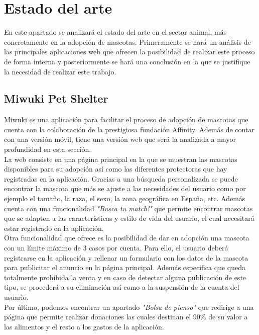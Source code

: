 \chapter{Estado del arte}\label{ch:estado-del-arte}

En este apartado se analizará el estado del arte en el sector animal, más concretamente en la adopción de mascotas.
Primeramente se hará un análisis de las principales aplicaciones web que ofrecen la posibilidad de realizar
este proceso de forma interna y posteriormente se hará una conclusión en la que se justifique la necesidad de realizar
este trabajo.

\section{Miwuki Pet Shelter}\label{sec:miwuki}

\href{https://petshelter.miwuki.com/}{Miwuki} es una aplicación para facilitar el proceso de adopción de mascotas que
cuenta con la colaboración de la prestigiosa fundación Affinity. Además de contar con una versión móvil, tiene una
versión web que será la analizada a mayor profundidad en esta sección. \\

La web consiste en una página principal en la que se muestran las mascotas disponibles para su adopción así como
las diferentes protectoras que hay registradas en la aplicación. Gracias a una búsqueda personalizada se puede
encontrar la mascota que más se ajuste a las necesidades del usuario como por ejemplo el tamaño, la raza, el sexo,
la zona geográfica en España, etc. Además cuenta con una funcionalidad \textit{"Busca tu match!"} que permite encontrar
mascotas que se adapten a las características y estilo de vida del usuario, el cual necesitará estar registrado
en la aplicación. \\

Otra funcionalidad que ofrece es la posibilidad de dar en adopción una mascota con un límite máximo de 3 casos por cuenta.
Para ello, el usuario deberá registrarse en la aplicación y rellenar un formulario con los datos de la mascota para
publicitar el anuncio en la página principal. Además especifica que queda totalmente prohibida la venta y en caso de
detectar alguna publicación de este tipo, se procederá a su eliminación así como a la suspensión de la cuenta del
usuario. \\

Por último, podemos encontrar un apartado \textit{"Bolsa de pienso"} que redirige a una página que permite
realizar donaciones las cuales destinan el 90\% de su valor a las alimentos y el resto a los gastos de la
aplicación. \\

